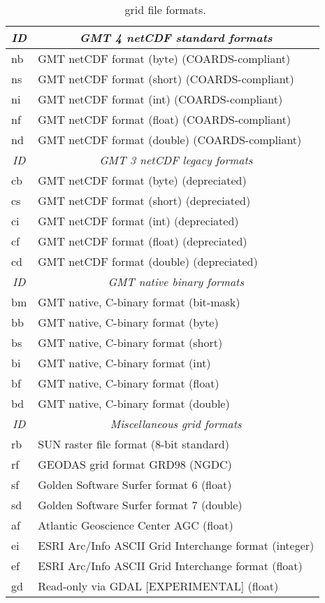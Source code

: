 \begin{table}[H]
\centering
\begin{tabular}{|l|l|} \hline
\multicolumn{1}{|c|}{\emph{ID}}	&	\multicolumn{1}{c|}{\emph{GMT 4 netCDF standard formats}} \\ \hline \hline
nb & GMT netCDF format (byte)   (COARDS-compliant)		\\ \hline
ns & GMT netCDF format (short)  (COARDS-compliant)		\\ \hline
ni & GMT netCDF format (int)    (COARDS-compliant)		\\ \hline
nf & GMT netCDF format (float)  (COARDS-compliant)		\\ \hline
nd & GMT netCDF format (double) (COARDS-compliant) 		\\ \hline \hline
\multicolumn{1}{|c|}{\emph{ID}}	&	\multicolumn{1}{c|}{\emph{GMT 3 netCDF legacy formats}} \\ \hline \hline
cb & GMT netCDF format (byte)	(depreciated) \\ \hline
cs & GMT netCDF format (short)	(depreciated) \\ \hline
ci & GMT netCDF format (int)	(depreciated) \\ \hline
cf & GMT netCDF format (float)	(depreciated) \\ \hline
cd & GMT netCDF format (double)	(depreciated) \\ \hline \hline
\multicolumn{1}{|c|}{\emph{ID}}	&	\multicolumn{1}{c|}{\emph{GMT native binary formats}} \\ \hline \hline
bm & GMT native, C-binary format (bit-mask)	\\ \hline
bb & GMT native, C-binary format (byte)		\\ \hline
bs & GMT native, C-binary format (short)	\\ \hline
bi & GMT native, C-binary format (int)		\\ \hline
bf & GMT native, C-binary format (float)	\\ \hline
bd & GMT native, C-binary format (double)	\\ \hline \hline
\multicolumn{1}{|c|}{\emph{ID}}	&	\multicolumn{1}{c|}{\emph{Miscellaneous grid formats}} \\ \hline \hline
rb & SUN raster file format (8-bit standard)	\\ \hline
rf & GEODAS grid format GRD98 (NGDC)		\\ \hline
sf & Golden Software Surfer format 6 (float)	\\ \hline
sd & Golden Software Surfer format 7 (double)	\\ \hline
af & Atlantic Geoscience Center AGC (float)	\\ \hline
ei & ESRI Arc/Info ASCII Grid Interchange format (integer)	\\ \hline
ef & ESRI Arc/Info ASCII Grid Interchange format (float)	\\ \hline
gd & Read-only via GDAL [EXPERIMENTAL] (float)	\\ \hline
\end{tabular}
\caption{\gmt\ grid file formats.}
\label{tbl:grdformats}
\end{table}

